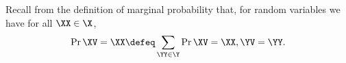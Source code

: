 \begin{definition}
  Recall from the definition of marginal probability that,
  for random variables 
  we have for all $\XX \in \X$,
  $$\Pr{\XV = \XX} \defeq \sum_{\YY \in \Y}\Pr{\XV = \XX, \YV = \YY}.$$%
\end{definition}
